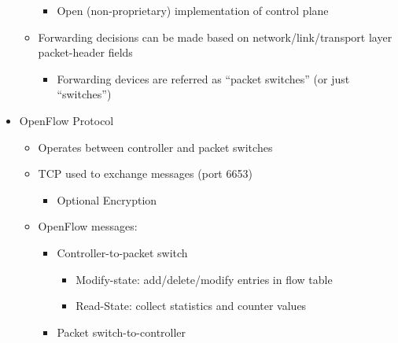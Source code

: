 \begin{itemize}
\begin{itemize}
\begin{itemize}
          \item Open (non-proprietary) implementation of control plane

        \end{itemize}

      \item Forwarding decisions can be made based on network/link/transport layer packet-header fields

        \begin{itemize}

          \item Forwarding devices are referred as ``packet switches'' (or just ``switches'')

        \end{itemize}

    \end{itemize}

  \item OpenFlow Protocol

    \begin{itemize}

      \item Operates between controller and packet switches

      \item TCP used to exchange messages (port 6653)

        \begin{itemize}

          \item Optional Encryption

        \end{itemize}

      \item OpenFlow messages:

        \begin{itemize}

          \item Controller-to-packet switch

            \begin{itemize}

              \item Modify-state: add/delete/modify entries in flow table

              \item Read-State: collect statistics and counter values

            \end{itemize}

          \item Packet switch-to-controller


\end{itemize}
\end{itemize}
\end{itemize}
